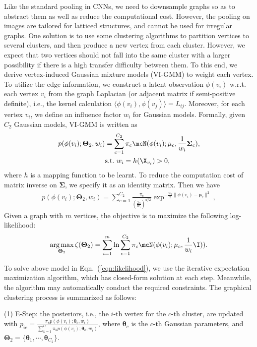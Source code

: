 \documentclass[letterpaper]{article} \usepackage{aaai19}  \usepackage{times}  \usepackage{helvet}  \usepackage{courier}  \usepackage{url}  \usepackage{graphicx}  \frenchspacing  \setlength{\pdfpagewidth}{8.5in}  \setlength{\pdfpageheight}{11in}
\DeclareMathOperator*{\argmax}{arg\,max}
\def\ie{{i.e.}} \def\etal{{et.al}}
\def\bSigma{\mathbf{\Sigma}} \def\bmu{\mathbf{\mu}}  \def\btheta{\mathbf{\theta}} \def\bTheta{\mathbf{\Theta}}
\begin{document}
Like the standard pooling in CNNs, we need to downsample graphs so as to abstract them as well as reduce the computational cost. However, the pooling on images are tailored for latticed structures, and cannot be used for irregular graphs. One solution is to use some clustering algorithms to partition vertices to several clusters, and then produce a new vertex from each cluster. However, we expect that two vertices should not fall into the same cluster with a larger possibility if there is a high transfer difficulty between them. To this end, we derive vertex-induced Gaussian mixture models (VI-GMM) to weight each vertex. To utilize the edge information,  we construct a latent observation $\phi(v_i)$ w.r.t. each vertex $v_i$ from the graph Laplacian (or adjacent matrix if semi-positive definite), \ie, the kernel calculation $\langle\phi(v_i),\phi(v_j)\rangle=L_{ij}$. Moreover, for each vertex $v_i$, we define an influence factor $w_i$ for Gaussian models. Formally, given $C_2$ Gaussian models, VI-GMM is written as
\begin{align}
p(\phi(v_i);\bTheta_2,w_i) &= \sum_{c=1}^{C_2}\pi_c\mcN(\phi(v_i); \bmu_c, \frac{1}{w_i}\bSigma_c), \nonumber \\
&\st  w_i=h(\X_{v_i})>0,
\end{align}
where $h$ is a mapping function to be learnt. To reduce the computation cost of matrix inverse on $\bSigma$, we specify it as an identity matrix. Then we have
\begin{align}
p(\phi(v_i);\bTheta_2,w_i) =  \sum_{c=1}^{C_2}\frac{\pi_c}{(\frac{2\pi}{w_i})^{d/2}}\exp^{-\frac{w_i}{2}\|\phi(v_i)-\bmu_c\|^2}, 
\end{align}
Given a graph with $m$ vertices, the objective is to maximize the following log-likelihood:
\begin{align}
\argmax_{\bTheta_2} \zeta(\bTheta_2) = \sum_{i=1}^m \ln\sum_{c=1}^{C_2}\pi_c\mcN(\phi(v_i); \bmu_c, \frac{1}{w_i}\I)). \label{eqn:likelihood}
\end{align}

To solve above model in Eqn.~(\ref{eqn:likelihood}), we use the iterative expectation maximization algorithm, which has closed-form solution at each step. Meanwhile, the algorithm may automatically conduct the required constraints. The graphical clustering process is summarized as follows:

(1) {E-Step}: the posteriors, \ie, the $i$-th vertex for the $c$-th cluster, are updated with
$p_{ic} = \frac{\pi_c p(\phi(v_i);\btheta_c, w_i)}{\sum_{k=1}^C \pi_k p(\phi(v_i);\btheta_k, w_i)}$,
where $\btheta_c$ is the $c$-th Gaussian parameters, and $\bTheta_2=\{\btheta_1,\cdots,\btheta_{C_2}\}$.
\end{document}
